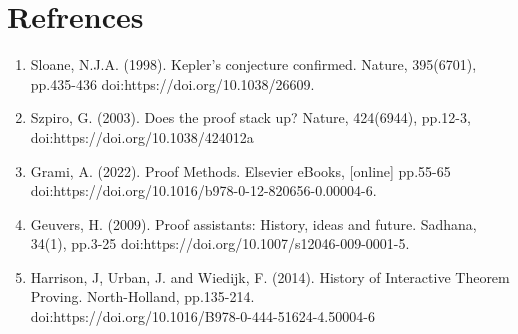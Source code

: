 \documentclass{article}
\begin{document}
\section{Refrences}
\begin{enumerate}
    \item Sloane, N.J.A. (1998). Kepler's conjecture confirmed. Nature, 395(6701), pp.435\hyp{}436 doi:https://doi.org/10.1038/26609.
    \item Szpiro, G. (2003). Does the proof stack up? Nature, 424(6944), pp.12\hyp{}3,  doi:https://doi.org/10.1038/424012a
    \item Grami, A. (2022). Proof Methods. Elsevier eBooks, [online] pp.55\hyp{}65 doi:https://doi.org/10.1016/b978-0-12-820656-0.00004-6.
    \item Geuvers, H. (2009). Proof assistants: History, ideas and future. Sadhana, 34(1), pp.3\hyp{}25 doi:https://doi.org/10.1007/s12046-009-0001-5.
    \item Harrison, J, Urban, J. and Wiedijk, F. (2014). History of Interactive Theorem Proving. North-Holland, pp.135\hyp{}214.\\doi:https://doi.org/10.1016/B978-0-444-51624-4.50004-6
\end{enumerate} 
\end{document}
